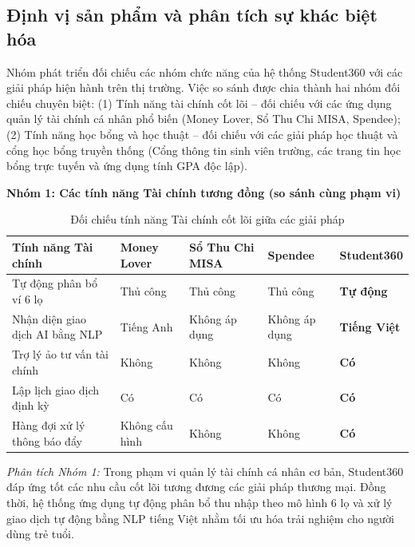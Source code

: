 \subsection{Định vị sản phẩm và phân tích sự khác biệt hóa}
Nhóm phát triển đối chiếu các nhóm chức năng của hệ thống Student360 với các giải pháp hiện hành trên thị trường. Việc so sánh được chia thành hai nhóm đối chiếu chuyên biệt: (1) Tính năng tài chính cốt lõi -- đối chiếu với các ứng dụng quản lý tài chính cá nhân phổ biến (Money Lover, Sổ Thu Chi MISA, Spendee); (2) Tính năng học bổng và học thuật -- đối chiếu với các giải pháp học thuật và cổng học bổng truyền thống (Cổng thông tin sinh viên trường, các trang tin học bổng trực tuyến và ứng dụng tính GPA độc lập).

\textbf{Nhóm 1: Các tính năng Tài chính tương đồng (so sánh cùng phạm vi)}

\begin{table}[H]
    \centering
    \begin{tabular}{|L{4.2cm}|C{2.6cm}|C{2.8cm}|C{2.8cm}|C{2.6cm}|}
        \hline
        \textbf{Tính năng Tài chính} & \textbf{Money Lover} & \textbf{Sổ Thu Chi MISA} & \textbf{Spendee} & \textbf{Student360} \\
        \hline
        Tự động phân bổ ví 6 lọ & Thủ công & Thủ công & Thủ công & \textbf{Tự động} \\ \hline
        Nhận diện giao dịch AI bằng NLP & Tiếng Anh & Không áp dụng & Không áp dụng & \textbf{Tiếng Việt} \\ \hline
        Trợ lý ảo tư vấn tài chính & Không & Không & Không & \textbf{Có} \\ \hline
        Lập lịch giao dịch định kỳ & Có & Có & Có & \textbf{Có} \\ \hline
        Hàng đợi xử lý thông báo đẩy & Không cấu hình & Không & Không & \textbf{Có} \\ \hline
    \end{tabular}

    \caption{Đối chiếu tính năng Tài chính cốt lõi giữa các giải pháp}
    \label{tab:comparison-finance}
\end{table}

\textit{Phân tích Nhóm 1:} Trong phạm vi quản lý tài chính cá nhân cơ bản, Student360 đáp ứng tốt các nhu cầu cốt lõi tương đương các giải pháp thương mại. Đồng thời, hệ thống ứng dụng tự động phân bổ thu nhập theo mô hình 6 lọ và xử lý giao dịch tự động bằng NLP tiếng Việt nhằm tối ưu hóa trải nghiệm cho người dùng trẻ tuổi.

